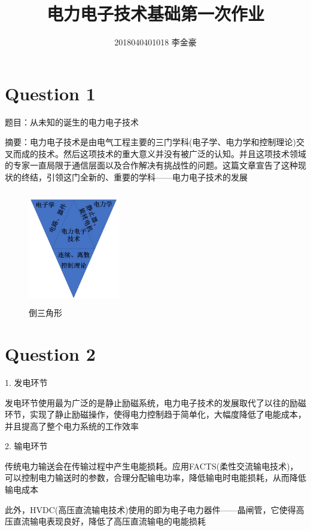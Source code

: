 \documentclass[a4paper]{article}
\begin{document}
\songti

\title{电力电子技术基础第一次作业}
\author{2018040401018 李金豪}

\maketitle

\section{Question 1}

题目：从未知的诞生的电力电子技术

摘要：电力电子技术是由电气工程主要的三门学科(电子学、电力学和控制理论)交叉而成的技术。然后这项技术的重大意义并没有被广泛的认知。并且这项技术领域的专家一直局限于通信层面以及合作解决有挑战性的问题。这篇文章宣告了这种现状的终结，引领这门全新的、重要的学科——电力电子技术的发展

\begin{figure}[htbp]
    \centering
    \includegraphics[width=4cm,height=5cm]{pic.png}
    \caption{倒三角形}
\end{figure}


\section{Question 2}

1. 发电环节 \cite{ref1}

发电环节使用最为广泛的是静止励磁系统，电力电子技术的发展取代了以往的励磁环节，实现了静止励磁操作，使得电力控制趋于简单化，大幅度降低了电能成本，并且提高了整个电力系统的工作效率 

2. 输电环节 

传统电力输送会在传输过程中产生电能损耗。应用FACTS(柔性交流输电技术)，可以控制电力输送时的参数，合理分配输电功率，降低输电时电能损耗，从而降低输电成本

此外，HVDC(高压直流输电技术)使用的即为电子电力器件——晶闸管，它使得高压直流输电表现良好，降低了高压直流输电的电能损耗
\end{document}

